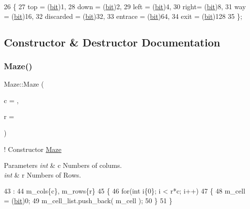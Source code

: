 \begin{DoxyCode}
26         \{
27             top = (\hyperlink{maze_8h_a789d352559efaa396a258805d44f4289}{bit})1,
28             down = (\hyperlink{maze_8h_a789d352559efaa396a258805d44f4289}{bit})2,
29             left = (\hyperlink{maze_8h_a789d352559efaa396a258805d44f4289}{bit})4,
30             right= (\hyperlink{maze_8h_a789d352559efaa396a258805d44f4289}{bit})8,
31             way = (\hyperlink{maze_8h_a789d352559efaa396a258805d44f4289}{bit})16,
32             discarded = (\hyperlink{maze_8h_a789d352559efaa396a258805d44f4289}{bit})32,
33             entrace = (\hyperlink{maze_8h_a789d352559efaa396a258805d44f4289}{bit})64,
34             exit = (\hyperlink{maze_8h_a789d352559efaa396a258805d44f4289}{bit})128
35         \};
\end{DoxyCode}


\subsection{Constructor \& Destructor Documentation}
\mbox{\label{classMaze_aa744020bbce986ebc4d33f30b7a2d52f}} 
\subsubsection{\texorpdfstring{Maze()}{Maze()}\hspace{0.1cm}{\footnotesize\ttfamily [1/2]}}
{\footnotesize\ttfamily Maze\+::\+Maze (\begin{DoxyParamCaption}\item[{int}]{c = {},  }\item[{int}]{r = {} }\end{DoxyParamCaption})\hspace{0.3cm}{\ttfamily [inline]}}



! Constructor \hyperlink{classMaze}{Maze} 


\begin{DoxyParams}{Parameters}
{\em int} & c Numbers of colums. \\
\hline
{\em int} & r Numbers of Rows. \\
\hline
\end{DoxyParams}

\begin{DoxyCode}
43                                       :
44             m\_cols\{c\}, m\_rows\{r\}
45         \{
46             \textcolor{keywordflow}{for}(\textcolor{keywordtype}{int} i\{0\}; i < r*c; i++)
47             \{
48                 m\_cell = (\hyperlink{maze_8h_a789d352559efaa396a258805d44f4289}{bit})0;
49                 m\_cell\_list.push\_back( m\_cell );
50             \}
51         \}
\end{DoxyCode}
\mbox{\label{classMaze_a4f187353f595193318ac66133a22287e}} 
